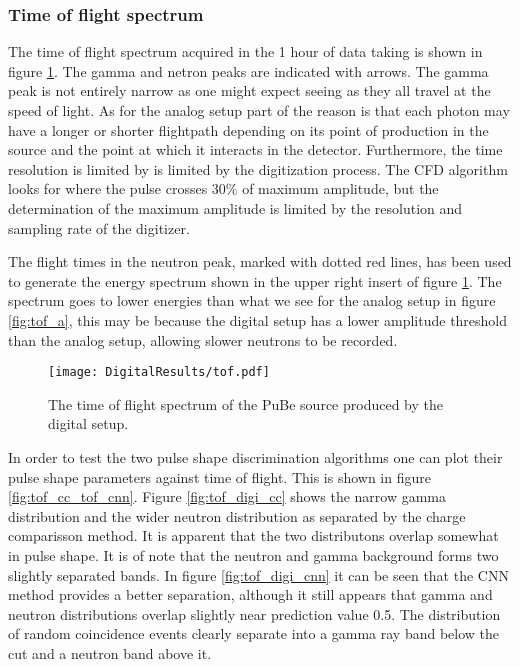 \documentclass[main.tex]{subfiles}
\begin{document}
\clearpage
\subsubsection{Time of flight spectrum}
The time of flight spectrum acquired in the 1 hour of data taking is shown in figure \ref{fig:tof_d}. The gamma and netron peaks are indicated with arrows. The gamma peak is not entirely narrow as one might expect seeing as they all travel at the speed of light. As for the analog setup part of the reason is that each photon may have a longer or shorter flightpath depending on its point of production in the source and the point at which it interacts in the detector. Furthermore, the time resolution is limited by is limited by the digitization process. The CFD algorithm looks for where the pulse crosses 30\% of maximum amplitude, but the determination of the maximum amplitude is limited by the resolution and sampling rate of the digitizer.

The flight times in the neutron peak, marked with dotted red lines, has been used to generate the energy spectrum shown in the upper right insert of figure \ref{fig:tof_d}. The spectrum goes to lower energies than what we see for the analog setup in figure \ref{fig:tof_a}, this may be because the digital setup has a lower amplitude threshold than the analog setup, allowing slower neutrons to be recorded.
\begin{figure}[ht]
    \centering
        \texttt{[image: DigitalResults/tof.pdf]}
        \caption{The time of flight spectrum of the PuBe source produced by the digital setup.}
    \label{fig:tof_d} 
\end{figure}

In order to test the two pulse shape discrimination algorithms one can plot their pulse shape parameters against time of flight. This is shown in figure \ref{fig:tof_cc_tof_cnn}. Figure \ref{fig:tof_digi_cc} shows the narrow gamma distribution and the wider neutron distribution as separated by the charge comparisson method. It is apparent that the two distributons overlap somewhat in pulse shape. It is of note that the neutron and gamma background forms two slightly separated bands.  In figure \ref{fig:tof_digi_cnn} it can be seen that the CNN method provides a better separation, although it still appears that gamma and neutron distributions overlap slightly near prediction value 0.5. The distribution of random coincidence events clearly separate into a gamma ray band below the cut and a neutron band above it.
\end{document}
